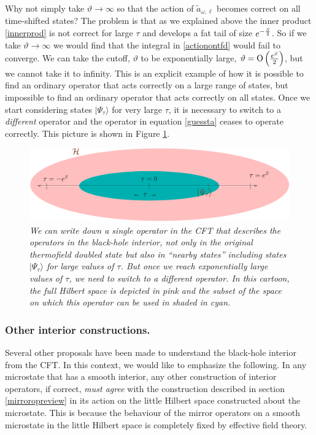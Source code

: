 \documentclass[12pt]{article}
\newcommand{\tfdtau}{\Psi_{\tau}} %
\newcommand{\cop}[1]{#1}
\def\ta{\widetilde{\cop{a}}}
\def\cutoffT{\vartheta}
\def\Or[#1]{{\text{O}}\left({#1}\right)}
\begin{document}
Why not simply take $\cutoffT \rightarrow \infty$ so that the action of $\ta_{\omega, \ell}$ becomes correct on all time-shifted states? The problem is that as we explained above the inner product \eqref{innerprod} is not correct for large $\tau$ and develops a fat tail of size $e^{-{S \over 2}}$. So if we take $\cutoffT \rightarrow \infty$ we would find that the integral in \eqref{actionontfd} would fail to converge. We can take the cutoff, $\cutoffT$ to be exponentially large, $\cutoffT = \Or[e^{S \over 2}]$, but we cannot take it to infinity. This is an explicit example of how it is possible to find
an ordinary  operator that acts correctly on a large range of states, but impossible to find an ordinary  operator that acts correctly on all states. Once we start considering states $|\tfdtau \rangle$ for very large $\tau$, it is necessary to switch to a {\em different} operator and the operator in equation \eqref{guessta} ceases to operate correctly. This picture is shown in Figure \ref{tshiftpatches}.
\begin{figure}[!ht]
\begin{center}
\includegraphics[width=\textwidth]{tshiftpatcheshpsi.pdf}
\caption{\em We can write down a single operator in the CFT that describes the operators in the black-hole interior, not only in the original thermofield doubled state but also in ``nearby states'' including states $|\tfdtau \rangle$ for large values of $\tau$. But once we reach exponentially large values of $\tau$, we need to switch to a different operator. In this cartoon, the full Hilbert space is depicted in pink and the subset of the space on which this operator can be used in shaded in cyan. \label{tshiftpatches}}
\end{center}
\end{figure}














\subsubsection*{Other interior constructions.}
Several other proposals have been made to understand the black-hole interior from the CFT. In this context, we would like to emphasize the following. In any microstate that has a smooth interior, any other construction of interior operators, if correct, {\em must agree} with the construction described in section \ref{mirroropreview} in its action on the little Hilbert space constructed about the microstate. This is because the behaviour of the mirror operators on a smooth microstate in the little Hilbert space is completely fixed by effective field theory.
\end{document}
